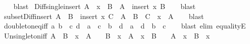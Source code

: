 \begin{isabellebody}
%
\isadelimproof
\ \ %
\endisadelimproof
%
\isatagproof
{}\isamarkupfalse%
\ blast%
\endisatagproof
{\isafoldproof}%
%
\isadelimproof
\isanewline
%
\endisadelimproof
\isanewline
{}\isamarkupfalse%
\ Diff{\isacharunderscore}{\kern0pt}single{\isacharunderscore}{\kern0pt}insert{\isacharcolon}{\kern0pt}\ {\isachardoublequoteopen}A\ {\isacharminus}{\kern0pt}\ {\isacharbraceleft}{\kern0pt}x{\isacharbraceright}{\kern0pt}\ {\isasymsubseteq}\ B\ {\isasymLongrightarrow}\ A\ {\isasymsubseteq}\ insert\ x\ B{\isachardoublequoteclose}\isanewline
%
\isadelimproof
\ \ %
\endisadelimproof
%
\isatagproof
{}\isamarkupfalse%
\ blast%
\endisatagproof
{\isafoldproof}%
%
\isadelimproof
\isanewline
%
\endisadelimproof
\isanewline
{}\isamarkupfalse%
\ subset{\isacharunderscore}{\kern0pt}Diff{\isacharunderscore}{\kern0pt}insert{\isacharcolon}{\kern0pt}\ {\isachardoublequoteopen}A\ {\isasymsubseteq}\ B\ {\isacharminus}{\kern0pt}\ insert\ x\ C\ {\isasymlongleftrightarrow}\ A\ {\isasymsubseteq}\ B\ {\isacharminus}{\kern0pt}\ C\ {\isasymand}\ x\ {\isasymnotin}\ A{\isachardoublequoteclose}\isanewline
%
\isadelimproof
\ \ %
\endisadelimproof
%
\isatagproof
{}\isamarkupfalse%
\ blast%
\endisatagproof
{\isafoldproof}%
%
\isadelimproof
\isanewline
%
\endisadelimproof
\isanewline
{}\isamarkupfalse%
\ doubleton{\isacharunderscore}{\kern0pt}eq{\isacharunderscore}{\kern0pt}iff{\isacharcolon}{\kern0pt}\ {\isachardoublequoteopen}{\isacharbraceleft}{\kern0pt}a{\isacharcomma}{\kern0pt}\ b{\isacharbraceright}{\kern0pt}\ {\isacharequal}{\kern0pt}\ {\isacharbraceleft}{\kern0pt}c{\isacharcomma}{\kern0pt}\ d{\isacharbraceright}{\kern0pt}\ {\isasymlongleftrightarrow}\ a\ {\isacharequal}{\kern0pt}\ c\ {\isasymand}\ b\ {\isacharequal}{\kern0pt}\ d\ {\isasymor}\ a\ {\isacharequal}{\kern0pt}\ d\ {\isasymand}\ b\ {\isacharequal}{\kern0pt}\ c{\isachardoublequoteclose}\isanewline
%
\isadelimproof
\ \ %
\endisadelimproof
%
\isatagproof
{}\isamarkupfalse%
\ {\isacharparenleft}{\kern0pt}blast\ elim{\isacharcolon}{\kern0pt}\ equalityE{\isacharparenright}{\kern0pt}%
\endisatagproof
{\isafoldproof}%
%
\isadelimproof
\isanewline
%
\endisadelimproof
\isanewline
{}\isamarkupfalse%
\ Un{\isacharunderscore}{\kern0pt}singleton{\isacharunderscore}{\kern0pt}iff{\isacharcolon}{\kern0pt}\ {\isachardoublequoteopen}A\ {\isasymunion}\ B\ {\isacharequal}{\kern0pt}\ {\isacharbraceleft}{\kern0pt}x{\isacharbraceright}{\kern0pt}\ {\isasymlongleftrightarrow}\ A\ {\isacharequal}{\kern0pt}\ {\isacharbraceleft}{\kern0pt}{\isacharbraceright}{\kern0pt}\ {\isasymand}\ B\ {\isacharequal}{\kern0pt}\ {\isacharbraceleft}{\kern0pt}x{\isacharbraceright}{\kern0pt}\ {\isasymor}\ A\ {\isacharequal}{\kern0pt}\ {\isacharbraceleft}{\kern0pt}x{\isacharbraceright}{\kern0pt}\ {\isasymand}\ B\ {\isacharequal}{\kern0pt}\ {\isacharbraceleft}{\kern0pt}{\isacharbraceright}{\kern0pt}\ {\isasymor}\ A\ {\isacharequal}{\kern0pt}\ {\isacharbraceleft}{\kern0pt}x{\isacharbraceright}{\kern0pt}\ {\isasymand}\ B\ {\isacharequal}{\kern0pt}\ {\isacharbraceleft}{\kern0pt}x{\isacharbraceright}{\kern0pt}{\isachardoublequoteclose}\isanewline

\end{isabellebody}
